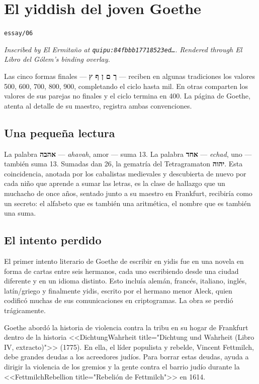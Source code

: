 \documentclass[11pt,openany]{book}
\begin{document}
\chapter*{El yiddish del joven Goethe}
\noindent\textcolor{soft}{\small\texttt{essay/06}}\par\vspace{0.5em}
\noindent\itshape\small\textcolor{soft}{Inscribed by El Ermita\~no at \texttt{quipu:84fbbb17718523ed\ldots}. Rendered through \emph{El Libro del G\'olem}'s binding overlay.}\normalfont\par\vspace{0.8em}
Las cinco formas finales — \textbf{ך ם ן ף ץ} — reciben en algunas tradiciones los valores 500, 600, 700, 800, 900, completando el ciclo hasta mil. En otras comparten los valores de sus parejas no finales y el ciclo termina en 400. La página de Goethe, atenta al detalle de su maestro, registra ambas convenciones.

\section*{Una pequeña lectura}

La palabra \textbf{אהבה} — \emph{ahavah}, amor — suma 13. La palabra \textbf{אחד} — \emph{echad}, uno — también suma 13. Sumadas dan 26, la gematría del Tetragramaton \textbf{יהוה}. Esta coincidencia, anotada por los cabalistas medievales y descubierta de nuevo por cada niño que aprende a sumar las letras, es la clase de hallazgo que un muchacho de once años, sentado junto a su maestro en Frankfurt, recibiría como un secreto: el alfabeto que es también una aritmética, el nombre que es también una suma.

\section*{El intento perdido}

El primer intento literario de Goethe de escribir en yidis fue en una novela en forma de cartas entre seis hermanos, cada uno escribiendo desde una ciudad diferente y en un idioma distinto. Esto incluía alemán, francés, italiano, inglés, latín/griego y finalmente yidis, escrito por el hermano menor Aleck, quien codificó muchas de sus comunicaciones en criptogramas. La obra se perdió trágicamente.

Goethe abordó la historia de violencia contra la tribu en su hogar de Frankfurt dentro de la historia <<DichtungWahrheit title="Dichtung und Wahrheit (Libro IV, extracto)">> (1775). En ella, el líder populista y rebelde, Vincent Fettmilch, debe grandes deudas a los acreedores judíos. Para borrar estas deudas, ayuda a dirigir la violencia de los gremios y la gente contra el barrio judío durante la <<FettmilchRebellion title="Rebelión de Fettmilch">> en 1614.
\end{document}
